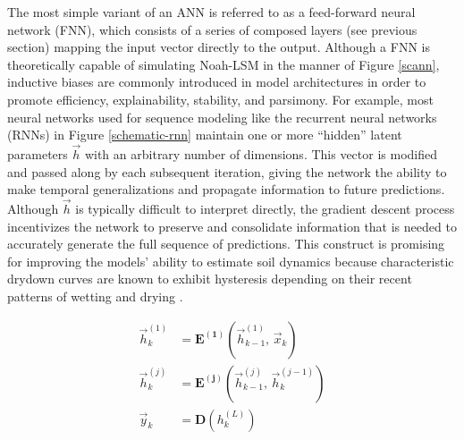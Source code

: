 The most simple variant of an ANN is referred to as a feed-forward neural network (FNN), which consists of a series of composed layers (see previous section) mapping the input vector directly to the output. Although a FNN is theoretically capable of simulating Noah-LSM in the manner of Figure \ref{scann}, inductive biases are commonly introduced in model architectures in order to promote efficiency, explainability, stability, and parsimony. For example, most neural networks used for sequence modeling like the recurrent neural networks (RNNs) in Figure \ref{schematic-rnn} maintain one or more ``hidden'' latent parameters $\vec{h}$ with an arbitrary number of dimensions. This vector is modified and passed along by each subsequent iteration, giving the network the ability to make temporal generalizations and propagate information to future predictions. Although $\vec{h}$ is typically difficult to interpret directly, the gradient descent process incentivizes the network to preserve and consolidate information that is needed to accurately generate the full sequence of predictions. This construct is promising for improving the models' ability to estimate soil dynamics because characteristic drydown curves are known to exhibit hysteresis depending on their recent patterns of wetting and drying \citep{haines_studies_1930}. %

\begin{equation}\label{eq_rnn}
    \begin{split}
        \vec{h}_k^{(1)} &= \mathbf{E^{(1)}}\left(\vec{h}_{k-1}^{(1)},\, \vec{x}_k\right) \\
        \vec{h}_k^{(j)} &= \mathbf{E^{(j)}}\left(\vec{h}_{k-1}^{(j)},\, \vec{h}_k^{(j-1)}\right) \\
        \vec{y}_k &= \mathbf{D}\left(h_k^{(L)}\right)
    \end{split}
\end{equation}

